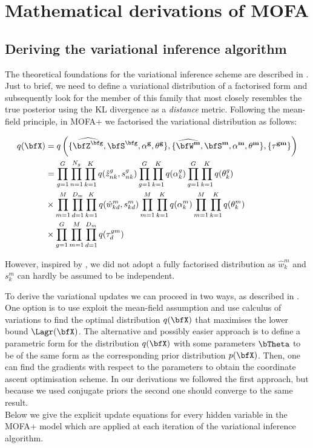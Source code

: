 \chapter{Mathematical derivations of MOFA} \label{appendix:mofa}

\section{Deriving the variational inference algorithm}

The theoretical foundations for the variational inference scheme are described in . Just to brief, we need to define a variational distribution of a factorised form and subsequently look for the member of this family that most closely resembles the true posterior using the KL divergence as a \textit{distance} metric. Following the mean-field principle, in MOFA+ we factorised the variational distribution as follows:

\begin{equation} \begin{aligned}
	q(\bfX) &= q \left(\{\widehat{\bfZ^\bfg}, \bfS^\bfg, \bf{\alpha^g}, \bf{\theta^g}\}, \{\widehat{\bfW^m}, \bfS^m, \bf\alpha^m, \bf\theta^m\}, \{ \bf\tau^{gm}\} \right)\\
	&= \prod_{g=1}^{G} \prod_{n=1}^{N_g} \prod_{k=1}^{K} q(\hat{z}_{nk}^g, s_{nk}^g) \prod_{g=1}^{G} \prod_{k=1}^{K} q(\alpha_k^g) \prod_{g=1}^{G} \prod_{k=1}^{K} q(\theta_k^g) \\
	&\times \prod_{m=1}^{M} \prod_{d=1}^{D_m} \prod_{k=1}^{K} q(\hat{w}_{kd}^m,s_{kd}^m) \prod_{m=1}^{M} \prod_{k=1}^{K} q(\alpha_k^m) \prod_{m=1}^{M} \prod_{k=1}^{K} q(\theta_k^m)  \\
	&\times \prod_{g=1}^{G} \prod_{m=1}^{M} \prod_{d=1}^{D_m} q(\tau_d^{gm})
\end{aligned} \end{equation}

However, inspired by \cite{Titsias2011}, we did not adopt a fully factorised distribution as $\hat{w}_k^m$ and $s_k^m$ can hardly be assumed to be independent.

To derive the variational updates we can proceed in two ways, as described in . One option is to use exploit the  mean-field assumption and use calculus of variations to find the optimal distribution $q(\bfX)$ that maximises the lower bound $\Lagr(\bfX)$\cite{Bishop2006,Murphy}. The alternative and possibly easier approach is to define a parametric form for the distribution $q(\bfX)$ with some parameters $\bTheta$ to be of the same form as the corresponding prior distribution $p(\bfX)$. Then, one can find the gradients with respect to the parameters to obtain the coordinate ascent optimisation scheme. In our derivations we followed the first approach, but because we used conjugate priors the second one should converge to the same result.\\
Below we give the explicit update equations for every hidden variable in the MOFA+ model which are applied at each iteration of the variational inference algorithm.

